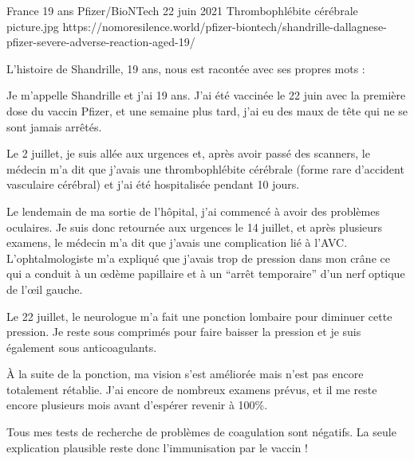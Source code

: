 {France}
{19 ans}
{Pfizer/BioNTech}
{22 juin 2021}
{Thrombophlébite cérébrale}
{picture.jpg}
{https://nomoresilence.world/pfizer-biontech/shandrille-dallagnese-pfizer-severe-adverse-reaction-aged-19/}
{

L'histoire de Shandrille, 19 ans, nous est racontée avec ses propres mots :

Je m'appelle Shandrille et j'ai 19 ans. J'ai été vaccinée le 22 juin avec la
première dose du vaccin Pfizer, et une semaine plus tard, j'ai eu des maux de
tête qui ne se sont jamais arrêtés.

Le 2 juillet, je suis allée aux urgences et, après avoir passé des scanners, le
médecin m'a dit que j'avais une thrombophlébite cérébrale (forme rare d'accident
vasculaire cérébral) et j'ai été hospitalisée pendant 10 jours.

Le lendemain de ma sortie de l'hôpital, j'ai commencé à avoir des problèmes
oculaires. Je suis donc retournée aux urgences le 14 juillet, et après plusieurs
examens, le médecin m'a dit que j'avais une complication lié à
l'AVC. L'ophtalmologiste m'a expliqué que j'avais trop de pression dans mon
crâne ce qui a conduit à un œdème papillaire et à un “arrêt temporaire” d'un
nerf optique de l'œil gauche.

Le 22 juillet, le neurologue m'a fait une ponction lombaire pour diminuer cette
pression. Je reste sous comprimés pour faire baisser la pression et je suis
également sous anticoagulants.

À la suite de la ponction, ma vision s'est améliorée mais n'est pas encore
totalement rétablie. J'ai encore de nombreux examens prévus, et il me reste
encore plusieurs mois avant d'espérer revenir à 100\%.

Tous mes tests de recherche de problèmes de coagulation sont négatifs. La seule
explication plausible reste donc l'immunisation par le vaccin !

}
